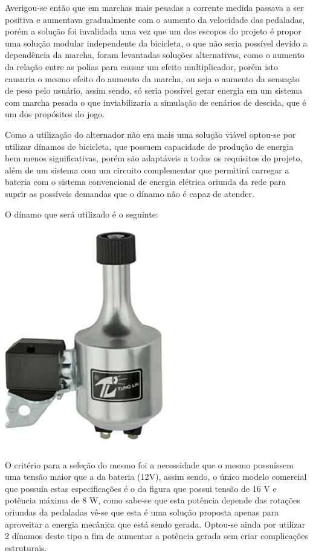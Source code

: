 Averigou-se então que em marchas mais pesadas a corrente medida passava a ser positiva e aumentava gradualmente com o aumento da velocidade das pedaladas, porém a solução foi invalidada uma vez que um dos escopos do projeto é propor uma solução modular independente da bicicleta, o que não seria possível devido a dependência da marcha, foram levantadas soluções alternativas, como o aumento da relação entre as polias para causar um efeito multiplicador, porém isto causaria o mesmo efeito do aumento da marcha, ou seja o aumento da sensação de peso pelo usuário, assim sendo, só seria possível gerar energia em um sistema com marcha pesada o que inviabilizaria a simulação de cenários de descida, que é um dos propósitos do jogo. 

Como a utilização do alternador não era mais uma solução viável optou-se por utilizar dínamos de bicicleta, que possuem capacidade de produção de energia bem menos significativas, porém são adaptáveis a todos os requisitos do projeto, além de um sistema com um circuito complementar que permitirá carregar a bateria com o sistema convencional de energia elétrica oriunda da rede para suprir as possíveis demandas que o dínamo não é capaz de atender.

O dínamo que será utilizado é o seguinte:


 \begin{center}
    	\includegraphics[scale=0.7]{figuras/dinamo}
        \label{dinamo}
    \end{center}
O critério para a seleção do mesmo foi a necessidade que o mesmo possuíssem uma tensão maior que a da bateria (12V), assim sendo, o único modelo comercial que possuía estas especificações é o da figura que possui tensão de 16 V e potência máxima de 8 W, como sabe-se que esta potência depende das rotações oriundas da pedaladas vê-se que esta é uma solução proposta apenas para aproveitar a energia mecânica que está sendo gerada. Optou-se ainda por utilizar 2 dínamos deste tipo a fim de aumentar a potência gerada sem criar complicações estruturais.  

